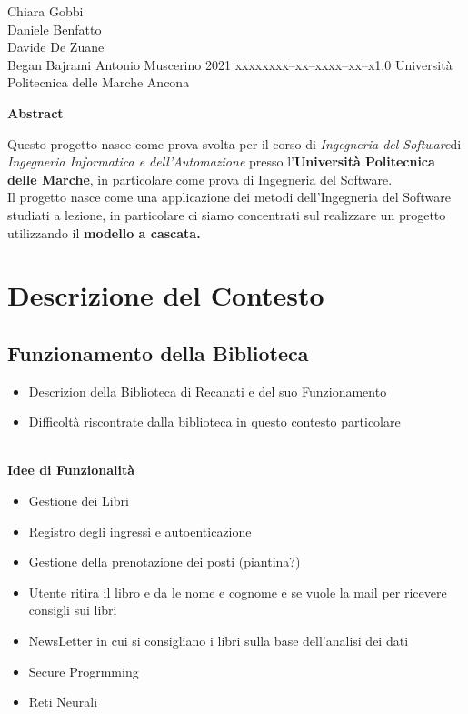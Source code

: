 \documentclass{tstextbook}
\begin{document}
\tsbook{\Huge }
       {Chiara Gobbi \\ Daniele Benfatto \\ Davide De Zuane \\ Began Bajrami}
       {Antonio Muscerino}
       {2021}
       {xxxxx}{xxx--xx--xxxx--xx--x}{1.0}
       {Università Politecnica delle Marche}
       {Ancona}



\begin{center}
	\textbf{\Large Abstract}
\end{center}
Questo progetto nasce come prova svolta per il corso di \textit{Ingegneria del Software}di \textit{Ingegneria Informatica e dell'Automazione} presso l'\textbf{Università Politecnica delle Marche}, in particolare come prova di Ingegneria del Software.\\
Il progetto nasce come una applicazione dei metodi dell'Ingegneria del Software studiati a lezione, in particolare ci siamo concentrati sul realizzare un progetto utilizzando il  \textbf{modello a cascata.}


\chapter{Descrizione del Contesto}
\section{Funzionamento della Biblioteca}
\begin{itemize}
	\item Descrizion della Biblioteca di Recanati e del suo  Funzionamento
	\item Difficoltà riscontrate dalla biblioteca in questo contesto particolare
	
\end{itemize}
	
	
	
	
	
	
\textbf{\Huge \\Idee di Funzionalità}
\begin{itemize}
	\item Gestione dei Libri
	\item Registro degli ingressi e autoenticazione 
	\item Gestione della prenotazione dei posti (piantina?)
	\item Utente ritira il libro e da le nome e cognome e se vuole la mail per ricevere consigli sui libri
	\item NewsLetter in cui si consigliano i libri sulla base dell'analisi dei dati
	\item Secure Progrmming
	\item Reti Neurali	
\end{itemize}
\end{document}
